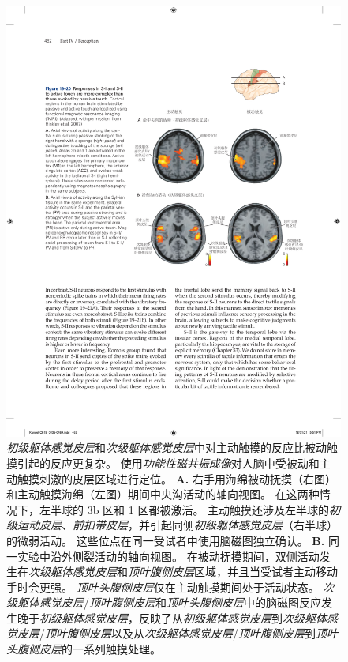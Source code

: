 \begin{figure}[htbp]
	\centering
	\includegraphics[width=0.85\linewidth]{chap19/fig_19_20}
	\caption{\textit{初级躯体感觉皮层}和\textit{次级躯体感觉皮层}中对主动触摸的反应比被动触摸引起的反应更复杂。
		使用\textit{功能性磁共振成像}对人脑中受被动和主动触摸刺激的皮层区域进行定位\cite{hinkley2007sensorimotor}。
		\textbf{A.} 右手用海绵被动抚摸（右图）和主动触摸海绵（左图）期间中央沟活动的轴向视图。 在这两种情况下，左半球的 3b 区和 1 区都被激活。
		主动触摸还涉及左半球的\textit{初级运动皮层}、\textit{前扣带皮层}，并引起同侧\textit{初级躯体感觉皮层}（右半球）的微弱活动。
		这些位点在同一受试者中使用脑磁图独立确认。
		\textbf{B.} 同一实验中沿外侧裂活动的轴向视图。
		在被动抚摸期间，双侧活动发生在\textit{次级躯体感觉皮层}和\textit{顶叶腹侧皮层}区域，并且当受试者主动移动手时会更强。
		\textit{顶叶头腹侧皮层}仅在主动触摸期间处于活动状态。
		\textit{次级躯体感觉皮层}/\textit{顶叶腹侧皮层}和\textit{顶叶头腹侧皮层}中的脑磁图反应发生晚于\textit{初级躯体感觉皮层}，反映了从\textit{初级躯体感觉皮层}到\textit{次级躯体感觉皮层}/\textit{顶叶腹侧皮层}以及从\textit{次级躯体感觉皮层}/\textit{顶叶腹侧皮层}到\textit{顶叶头腹侧皮层}的一系列触摸处理。}
	\label{fig:19_20}
\end{figure}


